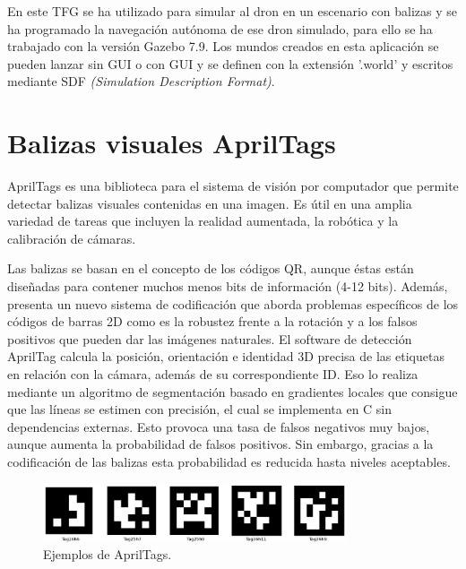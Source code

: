 \hspace{1cm} En este TFG se ha utilizado para simular al dron en un escenario con balizas y se ha programado la navegación autónoma de ese dron simulado, para ello se ha trabajado con la versión Gazebo 7.9. Los mundos creados en esta aplicación se pueden lanzar sin GUI o con GUI y se definen con la extensión '.world' y escritos mediante SDF \textit{(Simulation Description Format)}.

\section{Balizas visuales AprilTags}
\hspace{1cm} AprilTags \cite{AprilTags2} es una biblioteca para el sistema de visión por computador que permite detectar balizas visuales contenidas en una imagen. Es útil en una amplia variedad de tareas que incluyen la realidad aumentada, la robótica y la calibración de cámaras.

\hspace{1cm} Las balizas se basan en el concepto de los códigos QR, aunque éstas están diseñadas para contener muchos menos bits de información (4-12 bits). Además, presenta un nuevo sistema de codificación que aborda problemas específicos de los códigos de barras 2D como es la robustez frente a la rotación y a los falsos positivos que pueden dar las imágenes naturales. El software de detección AprilTag calcula la posición, orientación e identidad 3D precisa de las etiquetas en relación con la cámara, además de su correspondiente ID. Eso lo realiza mediante un algoritmo de segmentación basado en gradientes locales que consigue que las líneas se estimen con precisión, el cual se implementa en C sin dependencias externas. Esto provoca una tasa de falsos negativos muy bajos, aunque aumenta la probabilidad de falsos positivos. Sin embargo, gracias a la codificación de las balizas esta probabilidad es reducida hasta niveles aceptables.
\\

\begin{figure}[H]
	\begin{center}
		\includegraphics[width=0.8\textwidth]{imag/IMG25.png}
				\caption{Ejemplos de AprilTags.} 
	\label{fig:AprilTags.}	
	\end{center}
\end{figure}


